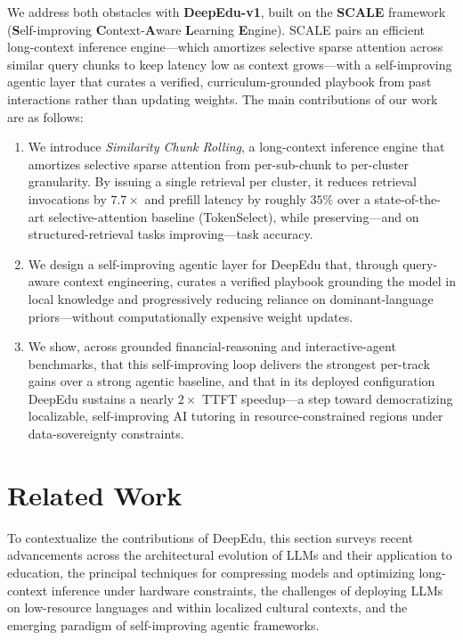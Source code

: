 \documentclass[10pt,conference]{IEEEtran}
\begin{document}
We address both obstacles with \textbf{DeepEdu-v1}, built on the \textbf{SCALE} framework (\textbf{S}elf-improving \textbf{C}ontext-\textbf{A}ware \textbf{L}earning \textbf{E}ngine). SCALE pairs an efficient long-context inference engine---which amortizes selective sparse attention across similar query chunks to keep latency low as context grows---with a self-improving agentic layer that curates a verified, curriculum-grounded playbook from past interactions rather than updating weights. The main contributions of our work are as follows:

\begin{enumerate}
    \item We introduce \textit{Similarity Chunk Rolling}, a long-context inference engine that amortizes selective sparse attention from per-sub-chunk to per-cluster granularity. By issuing a single retrieval per cluster, it reduces retrieval invocations by $7.7\times$ and prefill latency by roughly $35\%$ over a state-of-the-art selective-attention baseline (TokenSelect), while preserving---and on structured-retrieval tasks improving---task accuracy.
    \item We design a self-improving agentic layer for DeepEdu that, through query-aware context engineering, curates a verified playbook grounding the model in local knowledge and progressively reducing reliance on dominant-language priors---without computationally expensive weight updates.
    \item We show, across grounded financial-reasoning and interactive-agent benchmarks, that this self-improving loop delivers the strongest per-track gains over a strong agentic baseline, and that in its deployed configuration DeepEdu sustains a nearly $2\times$ TTFT speedup---a step toward democratizing localizable, self-improving AI tutoring in resource-constrained regions under data-sovereignty constraints.
\end{enumerate}

\section{Related Work}
\label{sec:related}
To contextualize the contributions of DeepEdu, this section surveys
recent advancements across the architectural evolution of LLMs and 
their application to education, the principal techniques for 
compressing models and optimizing long-context inference under hardware 
constraints, the challenges of deploying LLMs on low-resource languages 
and within localized cultural contexts, and the emerging paradigm of 
self-improving agentic frameworks.
\end{document}
